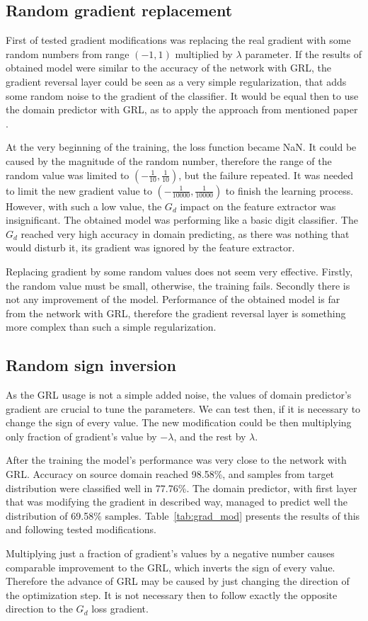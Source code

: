 \documentclass[shortabstract, inz, english]{iithesis}
\begin{document}
\subsection{Random gradient replacement}
First of tested gradient modifications was replacing the real gradient with some random numbers from range $(-1,1)$ multiplied by $\lambda$ parameter. If the results of obtained model were similar to the accuracy of the network with GRL, the gradient reversal layer could be seen as a very simple regularization, that adds some random noise to the gradient of the classifier. It would be equal then to use the domain predictor with GRL, as to apply the approach from mentioned paper \cite{noise}.
\par
At the very beginning of the training, the loss function became NaN. It could be caused by the magnitude of the random number, therefore the range of the random value was limited to $(-\frac{1}{10}, \frac{1}{10})$, but the failure repeated. It was needed to limit the new gradient value to $(-\frac{1}{10000}, \frac{1}{10000})$ to finish the learning process. However, with such a low value, the $G_{d}$ impact on the feature extractor was insignificant. The obtained model was performing like a basic digit classifier. The $G_{d}$ reached very high accuracy in domain predicting, as there was nothing that would disturb it, its gradient was ignored by the feature extractor.
\par
Replacing gradient by some random values does not seem very effective. Firstly, the random value must be small, otherwise, the training fails. Secondly there is not any improvement of the model. Performance of the obtained model is far from the network with GRL, therefore the gradient reversal layer is something more complex than such a simple regularization. 

\subsection{Random sign inversion}
As the GRL usage is not a simple added noise, the values of domain predictor's gradient are crucial to tune the parameters. We can test then, if it is necessary to change the sign of every value. The new modification could be then multiplying only fraction of gradient's value by $-\lambda$, and the rest by $\lambda$.
\par
After the training the model's performance was very close to the network with GRL. Accuracy on source domain reached 98.58\%, and samples from target distribution were classified well in 77.76\%. The domain predictor, with first layer that was modifying the gradient in described way, managed to predict well the distribution of 69.58\% samples. Table~\ref{tab:grad_mod} presents the results of this and following tested modifications.
\par
Multiplying just a fraction of gradient's values by a negative number causes comparable improvement to the GRL, which inverts the sign of every value. Therefore the advance of GRL may be caused by just changing the direction of the optimization step. It is not necessary then to follow exactly the opposite direction to the $G_{d}$ loss gradient. 
\end{document}
